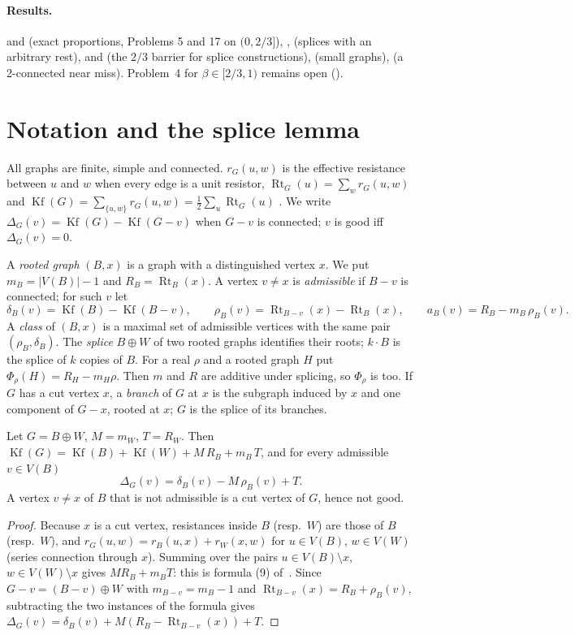 \documentclass[11pt,a4paper]{report}
\newcommand*{\Kf}{\operatorname{Kf}}
\newcommand*{\Rt}{\operatorname{Rt}}
\begin{document}
\paragraph{Results.}  and  (exact proportions, Problems 5 and 17 on
\((0,2/3]\)), ,  (splices with an arbitrary rest),  and
 (the \(2/3\) barrier for splice constructions),  (small graphs),
 (a 2-connected near miss). Problem~4 for \(\beta\in[2/3,1)\) remains open ().

\section{Notation and the splice lemma}\label{sec:splice}

All graphs are finite, simple and connected. \(r_G(u,w)\) is the effective resistance between \(u\) and \(w\) when every
edge is a unit resistor, \(\Rt_G(u)=\sum_wr_G(u,w)\) and \(\Kf(G)=\sum_{\{u,w\}}r_G(u,w)=\tfrac12\sum_u\Rt_G(u)\)
\autocite{KleinRandic1993,GutmanMohar1996}. We write \(\Delta_G(v)=\Kf(G)-\Kf(G-v)\) when \(G-v\) is connected; \(v\) is
good iff \(\Delta_G(v)=0\).

A \emph{rooted graph} \((B,x)\) is a graph with a distinguished vertex \(x\). We put \(m_B=|V(B)|-1\) and
\(R_B=\Rt_B(x)\). A vertex \(v\neq x\) is \emph{admissible} if \(B-v\) is connected; for such \(v\) let
\[\delta_B(v)=\Kf(B)-\Kf(B-v),\qquad\rho_B(v)=\Rt_{B-v}(x)-\Rt_B(x),\qquad a_B(v)=R_B-m_B\,\rho_B(v).\]
A \emph{class} of \((B,x)\) is a maximal set of admissible vertices with the same pair \((\rho_B,\delta_B)\). The
\emph{splice} \(B\oplus W\) of two rooted graphs identifies their roots; \(k\cdot B\) is the splice of \(k\) copies of
\(B\). For a real \(\rho\) and a rooted graph \(H\) put \(\Phi_\rho(H)=R_H-m_H\rho\). Then \(m\) and \(R\) are additive
under splicing, so \(\Phi_\rho\) is too. If \(G\) has a cut vertex \(x\), a \emph{branch} of \(G\) at \(x\) is the
subgraph induced by \(x\) and one component of \(G-x\), rooted at \(x\); \(G\) is the splice of its branches.

\begin{lemma}[note=splice lemma]\label{lem:splice}
Let \(G=B\oplus W\), \(M=m_W\), \(T=R_W\). Then
\(\Kf(G)=\Kf(B)+\Kf(W)+M\,R_B+m_B\,T\), and for every admissible \(v\in V(B)\)
\[\Delta_G(v)=\delta_B(v)-M\,\rho_B(v)+T .\]
A vertex \(v\neq x\) of \(B\) that is not admissible is a cut vertex of \(G\), hence not good.
\end{lemma}
\begin{proof}
Because \(x\) is a cut vertex, resistances inside \(B\) (resp.\ \(W\)) are those of \(B\) (resp.\ \(W\)), and
\(r_G(u,w)=r_B(u,x)+r_W(x,w)\) for \(u\in V(B)\), \(w\in V(W)\) (series connection through \(x\)). Summing over the
pairs \(u\in V(B)\setminus x\), \(w\in V(W)\setminus x\) gives \(M R_B+m_BT\): this is formula (9)
of~\autocite{GMD2026}. Since \(G-v=(B-v)\oplus W\) with \(m_{B-v}=m_B-1\) and \(\Rt_{B-v}(x)=R_B+\rho_B(v)\),
subtracting the two instances of the formula gives \(\Delta_G(v)=\delta_B(v)+M(R_B-\Rt_{B-v}(x))+T\).
\end{proof}
\end{document}
